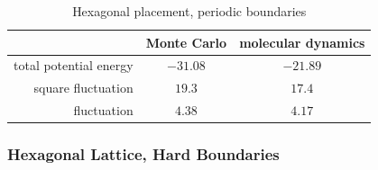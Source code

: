 \documentclass[UTF8,a4paper]{article}
\begin{document}
\begin{table}[H]
	\centering
	\caption{Hexagonal placement, periodic boundaries}
	\begin{tabular}{rcc}
		\toprule
		\toprule
		                       & Monte Carlo & molecular dynamics \\ \midrule
		total potential energy & $-31.08$    & $-21.89$           \\
		square fluctuation     & $19.3$      & $17.4$             \\
		fluctuation            & $4.38$      & $4.17$             \\
		\bottomrule
	\end{tabular}%
	\label{tab:rand_hard_2}%
\end{table}%

\subsubsection{Hexagonal Lattice, Hard Boundaries}
\end{document}

